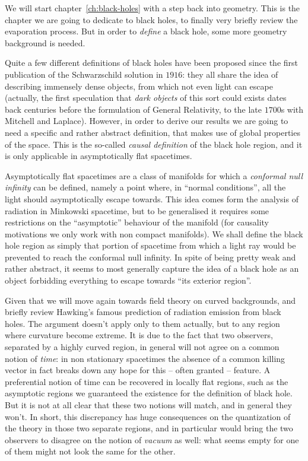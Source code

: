 We will start chapter~\ref{ch:black-holes} with a step back into geometry. This is the chapter we are going to dedicate to black holes, to finally very briefly review the evaporation process. But in order to \emph{define} a black hole, some more geometry background is needed. 

Quite a few different definitions of black holes have been proposed since the first publication of the Schwarzschild solution in \(1916\): they all share the idea of describing immensely dense objects, from which not even light can escape (actually, the first speculation that \emph{dark objects} of this sort could exists dates back centuries before the formulation of General Relativity, to the late \(1700\)s with Mitchell and Laplace). However, in order to derive our results we are going to need a specific and rather abstract definition, that makes use of global properties of the space. This is the so-called \emph{causal definition} of the black hole region, and it is only applicable in asymptotically flat spacetimes.

Asymptotically flat spacetimes are a class of manifolds for which a \emph{conformal null infinity} can be defined, namely a point where, in ``normal conditions'', all the light should asymptotically escape towards. This idea comes form the analysis of radiation in Minkowski spacetime, but to be generalised it requires some restrictions on the ``asymptotic'' behaviour of the manifold (for causality motivations we only work with non compact manifolds). We shall define the black hole region as simply that portion of spacetime from which a light ray would be prevented to reach the conformal null infinity. In spite of being pretty weak and rather abstract, it seems to most generally capture the idea of a black hole as an object forbidding everything to escape towards ``its exterior region''.

Given that we will move again towards field theory on curved backgrounds, and briefly review Hawking's famous prediction of radiation emission from black holes. The argument doesn't apply only to them actually, but to any region where curvature become extreme. It is due to the fact that two observers, separated by a highly curved region, in general will not agree on a common notion of \emph{time}: in non stationary spacetimes the absence of a common killing vector in fact breaks down any hope for this -- often granted -- feature. A preferential notion of time can be recovered in locally flat regions, such as the asymptotic regions we guaranteed the existence for the definition of black hole. But it is not at all clear that these two notions will match, and in general they won't. In short, this discrepancy has huge consequences on the quantization of the theory in those two separate regions, and in particular would bring the two observers to disagree on the notion of \emph{vacuum} as well: what seems empty for one of them might not look the same for the other. 

